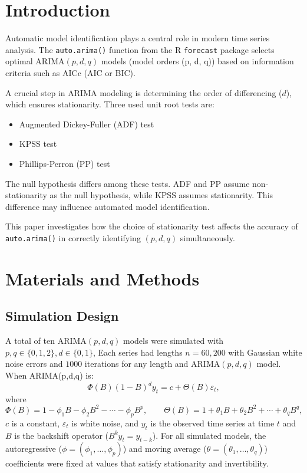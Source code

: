 \documentclass[twoside]{article}
\begin{document}
\section{Introduction}
\hspace{4mm}
Automatic model identification plays a central role in modern time series analysis. 
The \texttt{auto.arima()} function from the R \texttt{forecast} package 
\citep{Hyndman2008} selects optimal ARIMA$(p,d,q)$ models (model orders (p, d, q))
based on information criteria such as AICc (AIC or BIC).

A crucial step in ARIMA modeling is determining the order of differencing ($d$), 
which ensures stationarity. 
Three used unit root tests are:
\begin{itemize}
\item Augmented Dickey-Fuller (ADF) test \citep{Dickey1979}
\item KPSS test \citep{KPSS1992}
\item Phillips-Perron (PP) test \citep{Phillips1988}
\end{itemize}

The null hypothesis differs among these tests. 
ADF and PP assume non-stationarity as the null hypothesis, 
while KPSS assumes stationarity. 
This difference may influence automated model identification.

This paper investigates how the choice of stationarity test 
affects the accuracy of \texttt{auto.arima()} 
in correctly identifying $(p,d,q)$ simultaneously.
\section{Materials and Methods}
\subsection{Simulation Design}
\hspace{4mm}
A total of ten ARIMA$(p,d,q)$ models were simulated with
$p,q \in \{0,1,2\}, d \in \{0,1\}$,
Each series had lengths $n = 60,  200$ with Gaussian white noise errors and $1000$ iterations for any length and ARIMA$(p,d,q)$ model. When 
ARIMA(p,d,q) is:
\[
\Phi(B)(1-B)^d y_t = c + \Theta(B) \varepsilon_t,
\]
where
\[
\Phi(B) = 1 - \phi_1 B - \phi_2 B^2 - \cdots - \phi_p B^p, \qquad
\Theta(B) = 1 + \theta_1 B + \theta_2 B^2 + \cdots + \theta_q B^q,
\]
\(c\) is a constant, \(\varepsilon_t\) is white noise, and \(y_t\) is the observed time series at time \(t\) and \(B\) is the backshift operator (\(B^k y_t = y_{t-k}\)). For all simulated models, the autoregressive ($\phi = (\phi_1, \ldots, \phi_p)$) and moving average ($\theta = (\theta_1, \ldots, \theta_q)$) coefficients were fixed at values that satisfy stationarity and invertibility.\\
\end{document}
